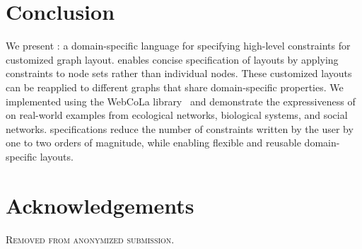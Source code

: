 \vspace{-7px}
\section{Conclusion}
We present \projectname: a domain-specific language for specifying high-level
constraints for customized graph layout. \projectname enables concise 
specification of layouts by applying constraints to node sets
rather than individual nodes. These customized layouts can
be reapplied to different graphs that share domain-specific properties.
We implemented \projectname using the WebCoLa library~\cite{WebCoLa} and demonstrate the expressiveness
of \projectname on real-world examples from ecological networks,
biological systems, and social networks. \projectname specifications reduce the
number of constraints written by the user by one to two orders of magnitude,
while enabling flexible and reusable domain-specific layouts.

\section*{Acknowledgements}
\textsc{Removed from anonymized submission.}
